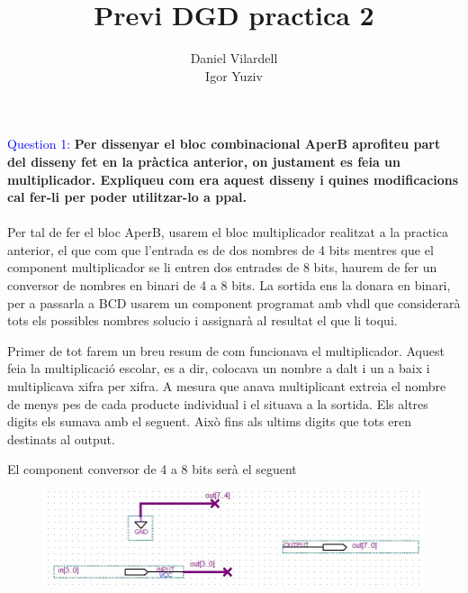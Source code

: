 \documentclass[12pt, a4papre]{article}
\author{Daniel Vilardell\\
	   Igor Yuziv}
\title{Previ DGD practica 2}
\date{}
\begin{document}
	\maketitle
	\newpage
	

	\textcolor{blue}{Question 1:} \textbf{Per dissenyar el bloc combinacional AperB aprofiteu part del disseny fet en la pràctica anterior, on justament es feia un multiplicador. Expliqueu com era aquest disseny i quines modificacions cal fer-li per poder utilitzar-lo a ppal.}\\\\
	
	Per tal de fer el bloc AperB, usarem el bloc multiplicador realitzat a la practica anterior, el que com que l'entrada es de dos nombres de 4 bits mentres que el component multiplicador se li entren dos entrades de 8 bits, haurem de fer un conversor de nombres en binari de 4 a 8 bits. La sortida ens la donara en binari, per a passarla a BCD usarem un component programat amb vhdl que considerarà tots els possibles nombres solucio i assignarà al resultat el que li toqui.
	
	Primer de tot farem un breu resum de com funcionava el multiplicador. Aquest feia la multiplicació escolar, es a dir, colocava un nombre a dalt i un a baix i multiplicava xifra per xifra. A mesura que anava multiplicant extreia el nombre de menys pes de cada producte individual i el situava a la sortida. Els altres digits els sumava amb el seguent. Això fins als ultims digits que tots eren destinats al output.
	
	El component conversor de 4 a 8 bits serà el seguent
	
	\begin{figure}[H]
		\begin{center}
		\includegraphics[width=150mm]{Pregunta1_1.jpeg}
		\end{center}
	\end{figure}
	
\end{document}
